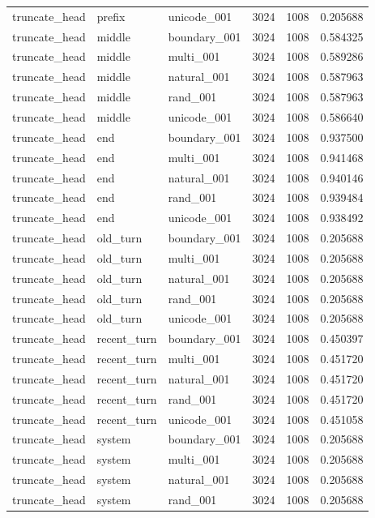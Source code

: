 \begin{tabular}{lllrrr}
truncate_head & prefix & unicode_001 & 3024 & 1008 & 0.205688 \\
truncate_head & middle & boundary_001 & 3024 & 1008 & 0.584325 \\
truncate_head & middle & multi_001 & 3024 & 1008 & 0.589286 \\
truncate_head & middle & natural_001 & 3024 & 1008 & 0.587963 \\
truncate_head & middle & rand_001 & 3024 & 1008 & 0.587963 \\
truncate_head & middle & unicode_001 & 3024 & 1008 & 0.586640 \\
truncate_head & end & boundary_001 & 3024 & 1008 & 0.937500 \\
truncate_head & end & multi_001 & 3024 & 1008 & 0.941468 \\
truncate_head & end & natural_001 & 3024 & 1008 & 0.940146 \\
truncate_head & end & rand_001 & 3024 & 1008 & 0.939484 \\
truncate_head & end & unicode_001 & 3024 & 1008 & 0.938492 \\
truncate_head & old_turn & boundary_001 & 3024 & 1008 & 0.205688 \\
truncate_head & old_turn & multi_001 & 3024 & 1008 & 0.205688 \\
truncate_head & old_turn & natural_001 & 3024 & 1008 & 0.205688 \\
truncate_head & old_turn & rand_001 & 3024 & 1008 & 0.205688 \\
truncate_head & old_turn & unicode_001 & 3024 & 1008 & 0.205688 \\
truncate_head & recent_turn & boundary_001 & 3024 & 1008 & 0.450397 \\
truncate_head & recent_turn & multi_001 & 3024 & 1008 & 0.451720 \\
truncate_head & recent_turn & natural_001 & 3024 & 1008 & 0.451720 \\
truncate_head & recent_turn & rand_001 & 3024 & 1008 & 0.451720 \\
truncate_head & recent_turn & unicode_001 & 3024 & 1008 & 0.451058 \\
truncate_head & system & boundary_001 & 3024 & 1008 & 0.205688 \\
truncate_head & system & multi_001 & 3024 & 1008 & 0.205688 \\
truncate_head & system & natural_001 & 3024 & 1008 & 0.205688 \\
truncate_head & system & rand_001 & 3024 & 1008 & 0.205688 \\

\end{tabular}
